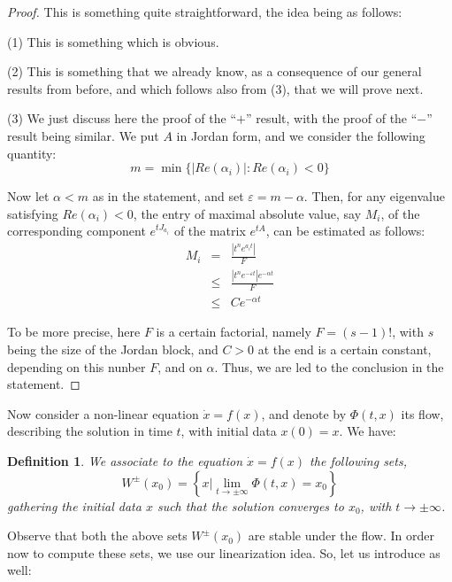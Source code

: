 \documentclass[12pt]{amsbook}
\newtheorem{definition}[theorem]{Definition}
\begin{document}
\begin{proof}
This is something quite straightforward, the idea being as follows:

\medskip

(1) This is something which is obvious.

\medskip

(2) This is something that we already know, as a consequence of our general results from before, and which follows also from (3), that we will prove next.

\medskip

(3) We just discuss here the proof of the ``$+$'' result, with the proof of the ``$-$'' result being similar. We put $A$ in Jordan form, and we consider the following quantity:
$$m=\min\Big\{|Re(\alpha_i)|:Re(\alpha_i)<0\Big\}$$

Now let $\alpha<m$ as in the statement, and set $\varepsilon=m-\alpha$. Then, for any eigenvalue satisfying $Re(\alpha_i)<0$, the entry of maximal absolute value, say $M_i$, of the corresponding component $e^{tJ_{a_i}}$ of the matrix $e^{tA}$, can be estimated as follows:
\begin{eqnarray*}
M_i
&=&\frac{|t^ne^{a_it}|}{F}\\
&\leq&\frac{|t^ne^{-\varepsilon t}|e^{-\alpha t}}{F}\\
&\leq&Ce^{-\alpha t}
\end{eqnarray*}

To be more precise, here $F$ is a certain factorial, namely $F=(s-1)!$, with $s$ being the size of the Jordan block, and $C>0$ at the end is a certain constant, depending on this nunber $F$, and on $\alpha$. Thus, we are led to the conclusion in the statement. 
\end{proof}

Now consider a non-linear equation $\dot{x}=f(x)$, and denote by $\Phi(t,x)$ its flow, describing the solution in time $t$, with initial data $x(0)=x$. We have:

\begin{definition}
We associate to the equation $\dot{x}=f(x)$ the following sets, 
$$W^\pm(x_0)=\left\{x\Big|\lim_{t\to\pm\infty}\Phi(t,x)=x_0\right\}$$
gathering the initial data $x$ such that the solution converges to $x_0$, with $t\to\pm\infty$.
\end{definition}

Observe that both the above sets $W^\pm(x_0)$ are stable under the flow. In order now to compute these sets, we use our linearization idea. So, let us introduce as well:
\end{document}
